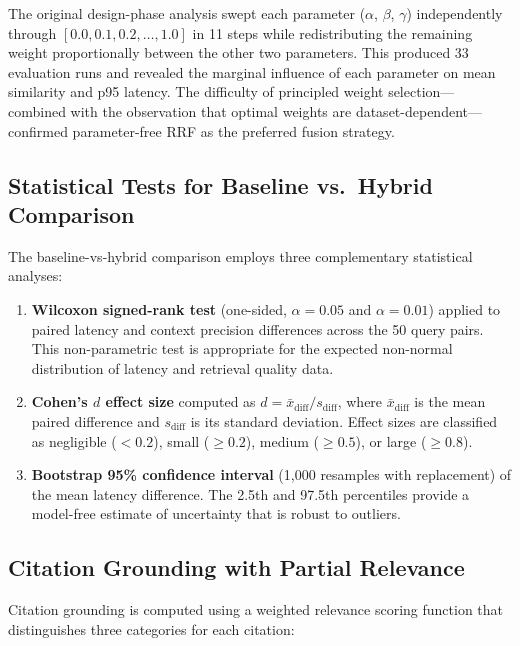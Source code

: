 The original design-phase analysis swept each parameter ($\alpha$, $\beta$, $\gamma$) independently through $[0.0, 0.1, 0.2, \ldots, 1.0]$ in 11 steps while redistributing the remaining weight proportionally between the other two parameters. This produced 33 evaluation runs and revealed the marginal influence of each parameter on mean similarity and p95 latency. The difficulty of principled weight selection---combined with the observation that optimal weights are dataset-dependent---confirmed parameter-free RRF as the preferred fusion strategy.

\subsection{Statistical Tests for Baseline vs.\ Hybrid Comparison}
\label{sec:stat_tests}

The baseline-vs-hybrid comparison employs three complementary statistical analyses:

\begin{enumerate}[leftmargin=0.5in]
  \item \textbf{Wilcoxon signed-rank test} (one-sided, $\alpha = 0.05$ and $\alpha = 0.01$) applied to paired latency and context precision differences across the 50 query pairs. This non-parametric test is appropriate for the expected non-normal distribution of latency and retrieval quality data.
  \item \textbf{Cohen's $d$ effect size} computed as $d = \bar{x}_{\text{diff}} / s_{\text{diff}}$, where $\bar{x}_{\text{diff}}$ is the mean paired difference and $s_{\text{diff}}$ is its standard deviation. Effect sizes are classified as negligible ($< 0.2$), small ($\geq 0.2$), medium ($\geq 0.5$), or large ($\geq 0.8$).
  \item \textbf{Bootstrap 95\% confidence interval} (1{,}000 resamples with replacement) of the mean latency difference. The 2.5th and 97.5th percentiles provide a model-free estimate of uncertainty that is robust to outliers.
\end{enumerate}

\subsection{Citation Grounding with Partial Relevance}
\label{sec:partial_relevance}

Citation grounding is computed using a weighted relevance scoring function that distinguishes three categories for each citation:

